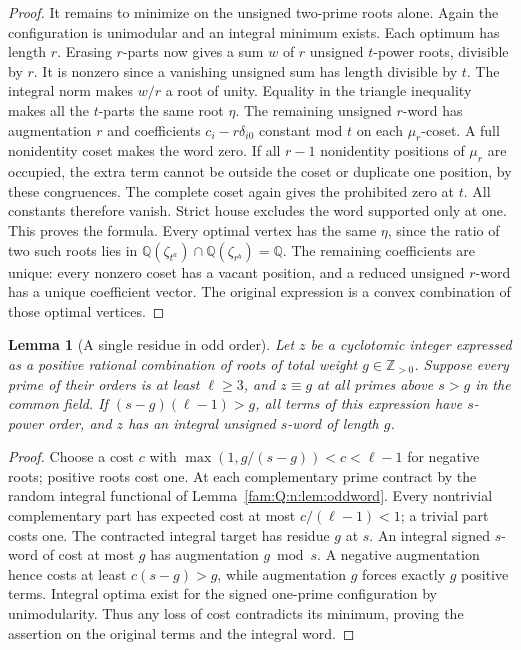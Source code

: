 \documentclass[11pt,a4paper]{article}
\numberwithin{equation}{section}
\newtheorem{lemma}[theorem]{Lemma}
\theoremstyle{remark}
\begin{document}
\begin{proof}
It remains to minimize on the unsigned two-prime roots alone. Again
the configuration is unimodular and an integral minimum exists.
Each optimum has length $r$. Erasing $r$-parts now gives a sum
$w$ of $r$ unsigned $t$-power roots, divisible by $r$. It is
nonzero since a vanishing unsigned sum has length divisible by $t$.
The integral norm makes $w/r$ a root of unity. Equality in the
triangle inequality makes all the $t$-parts the same root $\eta$.
The remaining unsigned $r$-word has augmentation $r$ and
coefficients $c_i-r\delta_{i0}$ constant mod $t$ on each $\mu_r$-coset.
A full nonidentity coset makes the word zero. If all $r-1$ nonidentity
positions of $\mu_r$ are occupied, the extra term cannot be outside
the coset or duplicate one position, by these congruences. The
complete coset again gives the prohibited zero at $t$. All constants
therefore vanish. Strict house excludes the word supported only at
one. This proves the formula. Every optimal vertex has the same
$\eta$, since the ratio of two such roots lies in
$\mathbb Q(\zeta_{t^a})\cap\mathbb Q(\zeta_{r^b})=\mathbb Q$.
The remaining coefficients are unique: every nonzero coset has a
vacant position, and a reduced unsigned $r$-word has a unique
coefficient vector. The original expression is a convex combination
of those optimal vertices.
\end{proof}

\begin{lemma}[A single residue in odd order]\label{fam:Q:2.5}\label{fam:Q:n:q12:positive}
Let $z$ be a cyclotomic integer expressed as a positive rational
combination of roots of total weight $g\in\mathbb Z_{>0}$.
Suppose every prime of their orders is at least $\ell\ge3$, and
$z\equiv g$ at all primes above $s>g$ in the common field.
If $(s-g)(\ell-1)>g$, all terms of this expression have $s$-power
order, and $z$ has an integral unsigned $s$-word of length $g$.
\end{lemma}
\begin{proof}
Choose a cost $c$ with $\max(1,g/(s-g))<c<\ell-1$ for negative
roots; positive roots cost one. At each complementary prime
contract by the random integral functional of
Lemma~\ref{fam:Q:n:lem:oddword}. Every nontrivial complementary part
has expected cost at most $c/(\ell-1)<1$; a trivial part costs
one. The contracted integral target has residue $g$ at $s$.
An integral signed $s$-word of cost at most $g$ has augmentation
$g\bmod s$. A negative augmentation hence costs at least
$c(s-g)>g$, while augmentation $g$ forces exactly $g$ positive
terms. Integral optima exist for the signed one-prime configuration
by unimodularity. Thus any loss of cost contradicts its minimum,
proving the assertion on the original terms and the integral word.
\end{proof}
\end{document}

